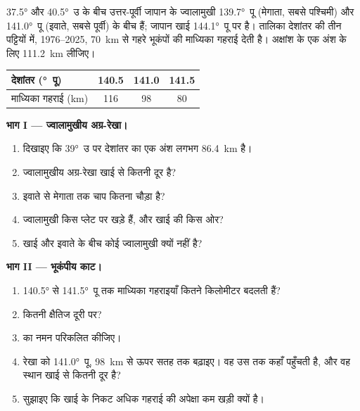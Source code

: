 \begin{problem}[{सप्ताहांत समस्या --- जापान के ज्वालामुखियों के नीचे}]
\label{pb:g12:subduction-magmatism:1}
\ang{37.5} और \ang{40.5}~उ के बीच उत्तर-पूर्वी जापान के ज्वालामुखी
\ang{139.7}~पू (मेगाता, सबसे पश्चिमी) और \ang{141.0}~पू (इवाते, सबसे
पूर्वी) के बीच हैं; जापान खाई \ang{144.1}~पू पर है। तालिका
देशांतर की तीन पट्टियों में, 1976--2025, \qty{70}{km} से गहरे भूकंपों की
माध्यिका गहराई देती है। अक्षांश के एक अंश के लिए \qty{111.2}{km} लीजिए।

\begin{center}
\small
\begin{tabular}{|l|c|c|c|}
\hline
देशांतर (\unit{\degree}~पू) & 140.5 & 141.0 & 141.5 \\ \hline
माध्यिका गहराई (\unit{km}) & 116 & 98 & 80 \\ \hline
\end{tabular}
\end{center}

\medskip
\noindent\textbf{भाग I --- ज्वालामुखीय अग्र-रेखा।}
\begin{enumerate}
  \item दिखाइए कि \ang{39}~उ पर देशांतर का एक अंश लगभग
        \qty{86.4}{km} है।
  \item ज्वालामुखीय अग्र-रेखा खाई से कितनी दूर है?
  \item इवाते से मेगाता तक चाप कितना चौड़ा है?
  \item ज्वालामुखी किस प्लेट पर खड़े हैं, और खाई की
        किस ओर?
  \item खाई और इवाते के बीच कोई ज्वालामुखी क्यों नहीं है?
\end{enumerate}

\medskip
\noindent\textbf{भाग II --- भूकंपीय काट।}
\begin{enumerate}[resume]
  \item \ang{140.5} से \ang{141.5}~पू तक माध्यिका गहराइयाँ कितने किलोमीटर
        बदलती हैं?
  \item कितनी क्षैतिज दूरी पर?
  \item {} का नमन परिकलित कीजिए।
  \item रेखा को \ang{141.0}~पू, \qty{98}{km} से ऊपर
        सतह तक बढ़ाइए। वह उस तक कहाँ पहुँचती है, और वह स्थान खाई से कितनी दूर है?
  \item सुझाइए कि  खाई के निकट अधिक गहराई की अपेक्षा कम खड़ी क्यों है।
\end{enumerate}


\end{problem}
